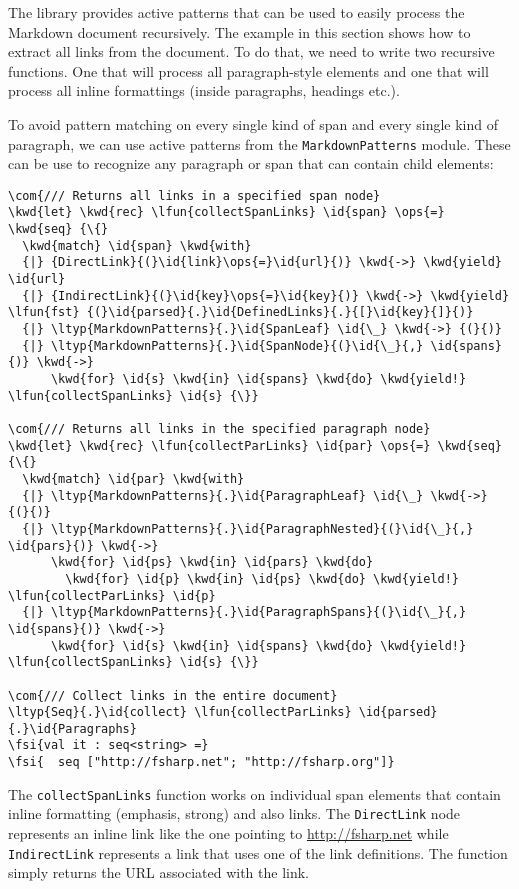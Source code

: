 \documentclass{article}
\newcommand{\id}[1]{\textcolor{black}{#1}}
\newcommand{\com}[1]{\textcolor{officegreen}{#1}}
\newcommand{\kwd}[1]{\textcolor{navy}{#1}}
\newcommand{\ops}[1]{\textcolor{purple}{#1}}
\newcommand{\fsi}[1]{\textcolor{outputcolor}{#1}}
\begin{document}
The library provides active patterns that can be used to easily process the Markdown
document recursively. The example in this section shows how to extract all links from the
document. To do that, we need to write two recursive functions. One that will process
all paragraph-style elements and one that will process all inline formattings (inside
paragraphs, headings etc.).


To avoid pattern matching on every single kind of span and every single kind of
paragraph, we can use active patterns from the \texttt{MarkdownPatterns} module. These can be use
to recognize any paragraph or span that can contain child elements:
\begin{Verbatim}[commandchars=\\\{\}]
\com{/// Returns all links in a specified span node}
\kwd{let} \kwd{rec} \lfun{collectSpanLinks} \id{span} \ops{=} \kwd{seq} {\{}
  \kwd{match} \id{span} \kwd{with}
  {|} {DirectLink}{(}\id{link}\ops{=}\id{url}{)} \kwd{->} \kwd{yield} \id{url}
  {|} {IndirectLink}{(}\id{key}\ops{=}\id{key}{)} \kwd{->} \kwd{yield} \lfun{fst} {(}\id{parsed}{.}\id{DefinedLinks}{.}{[}\id{key}{]}{)}
  {|} \ltyp{MarkdownPatterns}{.}\id{SpanLeaf} \id{\_} \kwd{->} {(}{)}
  {|} \ltyp{MarkdownPatterns}{.}\id{SpanNode}{(}\id{\_}{,} \id{spans}{)} \kwd{->}
      \kwd{for} \id{s} \kwd{in} \id{spans} \kwd{do} \kwd{yield!} \lfun{collectSpanLinks} \id{s} {\}}
      
\com{/// Returns all links in the specified paragraph node}
\kwd{let} \kwd{rec} \lfun{collectParLinks} \id{par} \ops{=} \kwd{seq} {\{}
  \kwd{match} \id{par} \kwd{with}
  {|} \ltyp{MarkdownPatterns}{.}\id{ParagraphLeaf} \id{\_} \kwd{->} {(}{)}
  {|} \ltyp{MarkdownPatterns}{.}\id{ParagraphNested}{(}\id{\_}{,} \id{pars}{)} \kwd{->} 
      \kwd{for} \id{ps} \kwd{in} \id{pars} \kwd{do} 
        \kwd{for} \id{p} \kwd{in} \id{ps} \kwd{do} \kwd{yield!} \lfun{collectParLinks} \id{p} 
  {|} \ltyp{MarkdownPatterns}{.}\id{ParagraphSpans}{(}\id{\_}{,} \id{spans}{)} \kwd{->}
      \kwd{for} \id{s} \kwd{in} \id{spans} \kwd{do} \kwd{yield!} \lfun{collectSpanLinks} \id{s} {\}}

\com{/// Collect links in the entire document}
\ltyp{Seq}{.}\id{collect} \lfun{collectParLinks} \id{parsed}{.}\id{Paragraphs}
\fsi{val it : seq<string> =}
\fsi{  seq ["http://fsharp.net"; "http://fsharp.org"]}
\end{Verbatim}



The \texttt{collectSpanLinks} function works on individual span elements that contain inline
formatting (emphasis, strong) and also links. The \texttt{DirectLink} node represents an inline
link like the one pointing to \href{http://fsharp.net}{http://fsharp.net} while \texttt{IndirectLink} represents a
link that uses one of the link definitions. The function simply returns the URL associated
with the link.
\end{document}
